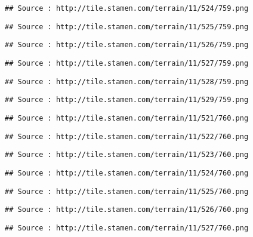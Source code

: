 \documentclass[
]{article}
\begin{document}
\begin{verbatim}
## Source : http://tile.stamen.com/terrain/11/524/759.png
\end{verbatim}

\begin{verbatim}
## Source : http://tile.stamen.com/terrain/11/525/759.png
\end{verbatim}

\begin{verbatim}
## Source : http://tile.stamen.com/terrain/11/526/759.png
\end{verbatim}

\begin{verbatim}
## Source : http://tile.stamen.com/terrain/11/527/759.png
\end{verbatim}

\begin{verbatim}
## Source : http://tile.stamen.com/terrain/11/528/759.png
\end{verbatim}

\begin{verbatim}
## Source : http://tile.stamen.com/terrain/11/529/759.png
\end{verbatim}

\begin{verbatim}
## Source : http://tile.stamen.com/terrain/11/521/760.png
\end{verbatim}

\begin{verbatim}
## Source : http://tile.stamen.com/terrain/11/522/760.png
\end{verbatim}

\begin{verbatim}
## Source : http://tile.stamen.com/terrain/11/523/760.png
\end{verbatim}

\begin{verbatim}
## Source : http://tile.stamen.com/terrain/11/524/760.png
\end{verbatim}

\begin{verbatim}
## Source : http://tile.stamen.com/terrain/11/525/760.png
\end{verbatim}

\begin{verbatim}
## Source : http://tile.stamen.com/terrain/11/526/760.png
\end{verbatim}

\begin{verbatim}
## Source : http://tile.stamen.com/terrain/11/527/760.png
\end{verbatim}
\end{document}
